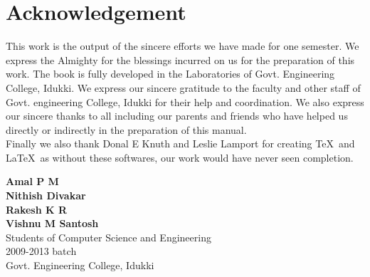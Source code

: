 \chapter*{Acknowledgement}
\thispagestyle{empty}
This work is the output of the sincere efforts we have made for one semester.
We express the Almighty for the blessings incurred on us for the preparation of this work. 
The book is fully developed in the  Laboratories of Govt. Engineering College, Idukki. 
We express our sincere gratitude to the faculty and other staff of Govt. engineering College, Idukki for their help and coordination. 
We also express our sincere thanks to all including our parents and friends who have helped us directly or indirectly in the preparation of this manual.\\

Finally we also thank Donal E Knuth and Leslie Lamport for creating \TeX~and \LaTeX ~as without these softwares, our work would have never seen completion.
\\[1cm]
\begin{flushright}
\begin{minipage}{6cm}
	\textbf{Amal P M}\\[0.4em]
	\textbf{Nithish Divakar}\\[0.4em]
	\textbf{Rakesh K R}\\[0.4em]
	\textbf{Vishnu M Santosh}\\[0.4em]
	\tiny{Students of Computer Science and Engineering\\
	2009-2013 batch\\
	Govt. Engineering College, Idukki\\}
\end{minipage}
 \end{flushright}
